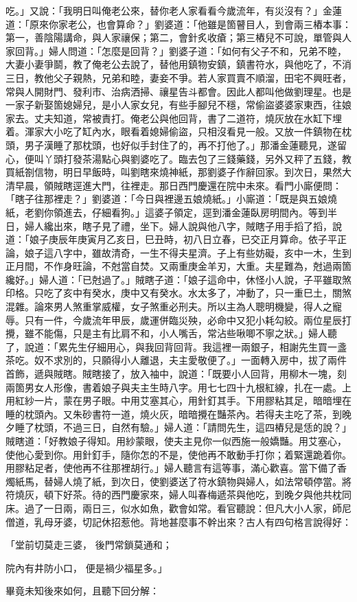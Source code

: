 \begin{showcontents}{}
吃。」又說：「我明日叫俺老公來，替你老人家看看今歲流年，有災沒有？」金蓮道：「原來你家老公，也會算命？」劉婆道：「他雖是箇瞽目人，到會兩三樁本事：第一，善陰陽講命，與人家禳保；第二，會針炙收瘡；第三樁兒不可說，單管與人家回背。」婦人問道：「怎麼是回背？」劉婆子道：「如何有父子不和，兄弟不睦，大妻小妻爭鬬，教了俺老公去說了，替他用鎮物安鎮，鎮書符水，與他吃了，不消三日，教他父子親熱，兄弟和睦，妻妾不爭。若人家買賣不順溜，田宅不興旺者，常與人開財門、發利市、治病洒掃、禳星告斗都會。因此人都叫他做劉理星。也是一家子新娶箇媳婦兒，是小人家女兒，有些手腳兒不穩，常偷盜婆婆家東西，往娘家去。丈夫知道，常被責打。俺老公與他回背，書了二道符，燒灰放在水缸下埋着。渾家大小吃了缸內水，眼看着媳婦偷盜，只相沒看見一般。又放一件鎮物在枕頭，男子漢睡了那枕頭，也好似手封住了的，再不打他了。」那潘金蓮聽見，遂留心，便叫丫頭打發茶湯點心與劉婆吃了。臨去包了三錢藥錢，另外又秤了五錢，教買紙劄信物，明日早飯時，叫劉瞎來燒神紙，那劉婆子作辭回家。到次日，果然大清早晨，領賊瞎逕進大門，往裡走。那日西門慶還在院中未來。看門小廝便問：「瞎子往那裡走？」劉婆道：「今日與裡邊五娘燒紙。」小廝道：「既是與五娘燒紙，老劉你領進去，仔細看狗。」這婆子領定，逕到潘金蓮臥房明間內。等到半日，婦人纔出來，瞎子見了禮，坐下。婦人說與他八字，賊瞎子用手搯了搯，說道：「娘子庚辰年庚寅月乙亥日，巳丑時，初八日立春，已交正月算命。依子平正論，娘子這八字中，雖故清奇，一生不得夫星濟。子上有些妨礙，亥中一木，生到正月間，不作身旺論，不尅當自焚。又兩重庚金羊刃，大重。夫星難為，尅過兩箇纔好。」婦人道：「已尅過了。」賊瞎子道：「娘子這命中，休怪小人說，子平雖取煞印格。只吃了亥中有癸水，庚中又有癸水。水太多了，冲動了，只一重巳土，關煞混雜。論來男人煞重掌威權，女子煞重必刑夫。所以主為人聰明機變，得人之寵辱。只有一件，今歲流年甲辰，歲運併臨災殃，必命中又犯小耗勾絞。兩位星辰打攪，雖不能傷，只是主有比肩不和，小人嘴舌，常沾些啾唧不寧之狀。」婦人聽了，說道：「累先生仔細用心，與我回背回背。我這裡一兩銀子，相謝先生買一盞茶吃。奴不求別的，只願得小人離退，夫主愛敬便了。」一面轉入房中，拔了兩件首飾，遞與賊瞎。賊瞎接了，放入袖中，說道：「既要小人回背，用柳木一塊，刻兩箇男女人形像，書着娘子與夫主生時八字。用七七四十九根紅線，扎在一處。上用紅紗一片，蒙在男子眼。中用艾塞其心，用針釘其手。下用膠粘其足，暗暗埋在睡的枕頭內。又朱砂書符一道，燒火灰，暗暗攪在豔茶內。若得夫主吃了茶，到晚夕睡了枕頭，不過三日，自然有驗。」婦人道：「請問先生，這四樁兒是恁的說？」賊瞎道：「好教娘子得知。用紗蒙眼，使夫主見你一似西施一般嬌豔。用艾塞心，使他心愛到你。用針釘手，隨你怎的不是，使他再不敢動手打你；着緊還跪着你。用膠粘足者，使他再不往那裡胡行。」婦人聽言有這等事，滿心歡喜。當下備了香燭紙馬，替婦人燒了紙，到次日，使劉婆送了符水鎮物與婦人，如法常頓停當。將符燒灰，頓下好茶。待的西門慶家來，婦人叫春梅遞茶與他吃，到晚夕與他共枕同床。過了一日兩，兩日三，似水如魚，歡會如常。看官聽說：但凡大小人家，師尼僧道，乳母牙婆，切記休招惹他。背地甚麼事不幹出來？古人有四句格言說得好：

「堂前切莫走三婆，  後門常鎖莫通和；

院內有井防小口，  便是禍少福星多。」

畢竟未知後來如何，且聽下回分解：




\end{showcontents}

